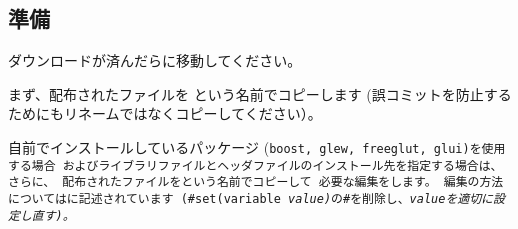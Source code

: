 \subsection{準備}
\label{subsec:PrepareLibrary}

\noindent
ダウンロードが済んだらに移動してください。

\noindent
まず、配布されたファイルを
\CMakeLists{}という名前でコピーします
(誤コミットを防止するためにもリネームではなくコピーしてください）。

\medskip
\begin{narrow}[15pt]
\end{narrow}

\medskip
\noindent
自前でインストールしているパッケージ
(\tt{boost}, \tt{glew}, \tt{freeglut}, \tt{glui})を使用する場合
およびライブラリファイルとヘッダファイルのインストール先を指定する場合は、
さらに、
配布されたファイルを\CMakeConf{}という名前でコピーして
必要な編集をします。
編集の方法については\CMakeConf{}に記述されています
(\tt{\#set(variable \it{value})}の\tt{\#}を削除し、\it{value}を適切に設定し直す)。

